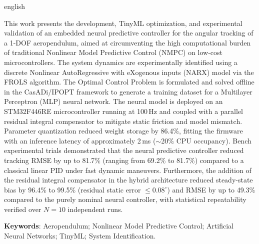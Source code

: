 \begin{resumo}
\SingleSpacing
    \begin{otherlanguage*}{english}

        \noindent This work presents the development, TinyML optimization, and experimental validation of an embedded neural predictive controller for the angular tracking of a 1-DOF aeropendulum, aimed at circumventing the high computational burden of traditional Nonlinear Model Predictive Control (NMPC) on low-cost microcontrollers. The system dynamics are experimentally identified using a discrete Nonlinear AutoRegressive with eXogenous inputs (NARX) model via the FROLS algorithm. The Optimal Control Problem is formulated and solved offline in the CasADi/IPOPT framework to generate a training dataset for a Multilayer Perceptron (MLP) neural network. The neural model is deployed on an STM32F446RE microcontroller running at 100\,Hz and coupled with a parallel residual integral compensator to mitigate static friction and model mismatch. Parameter quantization reduced weight storage by 86.4\%, fitting the firmware with an inference latency of approximately 2\,ms ($\sim$20\% CPU occupancy). Bench experimental trials demonstrated that the neural predictive controller reduced tracking RMSE by up to 81.7\% (ranging from 69.2\% to 81.7\%) compared to a classical linear PID under fast dynamic maneuvers. Furthermore, the addition of the residual integral compensator in the hybrid architecture reduced steady-state bias by 96.4\% to 99.5\% (residual static error $\le 0.08^\circ$) and RMSE by up to 49.3\% compared to the purely nominal neural controller, with statistical repeatability verified over $N = 10$ independent runs.

        \vspace{\onelineskip}

        \noindent 
        \textbf{Keywords}: Aeropendulum; Nonlinear Model Predictive Control; Artificial Neural Networks; TinyML; System Identification.

    \end{otherlanguage*}
\end{resumo}




\listoffigures*
\cleardoublepage






